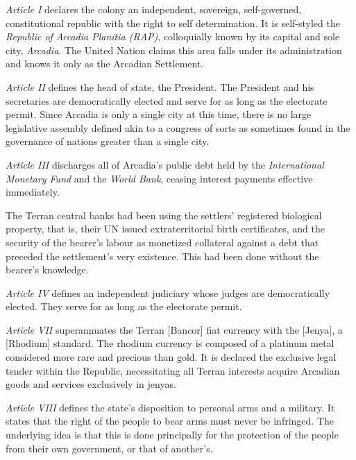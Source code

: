 
\startitemize[5]
\item {\it Article I} declares the colony an independent, sovereign, self-governed, constitutional republic with the right to self determination. It is self-styled the {\it Republic of Arcadia Planitia (RAP)}, colloquially known by its capital and sole city, {\it Arcadia}. The United Nation claims this area falls under its administration and knows it only as the Arcadian Settlement.

\item {\it Article II} defines the head of state, the President. The President and his secretaries are democratically elected and serve for as long as the electorate permit. Since Arcadia is only a single city at this time, there is no large legislative assembly defined akin to a congress of sorts as sometimes found in the governance of nations greater than a single city.

\item {\it Article III} discharges all of Arcadia's public debt held by the {\it International Monetary Fund} and the {\it World Bank}, ceasing interest payments effective immediately. 

The Terran central banks had been using the settlers' registered biological property, that is, their UN issued extraterritorial birth certificates, and the security of the bearer's labour as monetized collateral against a debt that preceded the settlement's very existence. This had been done without the bearer's knowledge.

\item {\it Article IV} defines an independent judiciary whose judges are democratically elected. They serve for as long as the electorate permit.

\item {\it Article VII} superannuates the Terran [Bancor] fiat currency with the [Jenya], a [Rhodium] standard. The rhodium currency is composed of a platinum metal considered more rare and precious than gold. It is declared the exclusive legal tender within the Republic, necessitating all Terran interests acquire Arcadian goods and services exclusively in jenyas.

\item {\it Article VIII} defines the state's disposition to personal arms and a military. It states that the right of the people to bear arms must never be infringed. The underlying idea is that this is done principally for the protection of the people from their own government, or that of another's.


